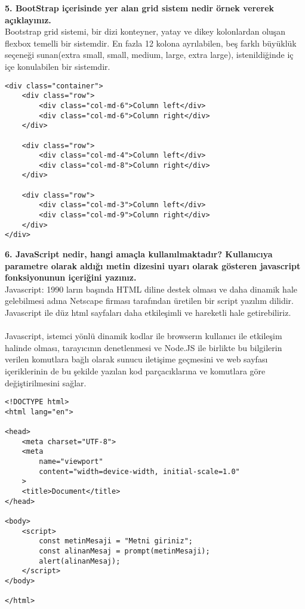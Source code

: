 \documentclass[a4paper,10pt]{article}
\begin{document}
\textbf{5. BootStrap içerisinde yer alan grid sistem nedir örnek vererek açıklayınız.}\\

Bootstrap grid sistemi, bir dizi konteyner, yatay ve dikey kolonlardan oluşan flexbox temelli bir sistemdir.
En fazla 12 kolona ayrılabilen, beş farklı büyüklük seçeneği sunan(extra small, small, medium, large, extra large), istenildiğinde iç içe konulabilen bir sistemdir.
    
\begin{lstlisting}
<div class="container">
    <div class="row">
        <div class="col-md-6">Column left</div>
        <div class="col-md-6">Column right</div>
    </div>
    
    <div class="row">
        <div class="col-md-4">Column left</div>
        <div class="col-md-8">Column right</div>
    </div>
    
    <div class="row">
        <div class="col-md-3">Column left</div>
        <div class="col-md-9">Column right</div>
    </div>
</div>
\end{lstlisting}
  
\pagebreak

\textbf{6. JavaScript nedir, hangi amaçla kullanılmaktadır? Kullanıcıya parametre olarak aldığı metin dizesini uyarı olarak gösteren javascript fonksiyonunun içeriğini yazınız.}\\
    
Javascript: 1990 ların başında HTML diline destek olması ve daha dinamik hale gelebilmesi adına Netscape firması tarafından üretilen bir script yazılım dilidir. Javascript ile düz html sayfaları daha etkileşimli ve hareketli hale getirebiliriz.\\\\
\quad \quad \quad \quad \quad Javascript,  istemci yönlü dinamik kodlar ile browserın kullanıcı ile etkileşim halinde olması, tarayıcının denetlenmesi ve Node.JS ile birlikte bu bilgilerin verilen komutlara bağlı olarak sunucu iletişime geçmesini ve web sayfası içeriklerinin de bu şekilde yazılan kod parçacıklarına ve komutlara göre değiştirilmesini sağlar.
  
\begin{lstlisting}
<!DOCTYPE html>
<html lang="en">

<head>
    <meta charset="UTF-8">
    <meta
        name="viewport"
        content="width=device-width, initial-scale=1.0"
    >
    <title>Document</title>
</head>

<body>
    <script>
        const metinMesaji = "Metni giriniz";
        const alinanMesaj = prompt(metinMesaji);
        alert(alinanMesaj);
    </script>
</body>

</html>
\end{lstlisting}
    
\end{document}
